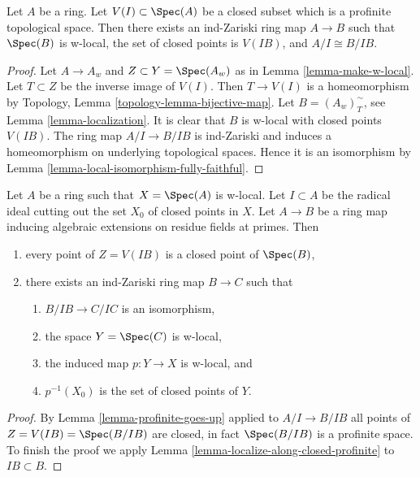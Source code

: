 \begin{lemma}
\label{lemma-localize-along-closed-profinite}
Let $A$ be a ring. Let $V(I) \subset \Spec(A)$ be a closed subset
which is a profinite topological space. Then there exists an
ind-Zariski ring map $A \to B$ such that $\Spec(B)$ is w-local,
the set of closed points is $V(IB)$, and $A/I \cong B/IB$.
\end{lemma}

\begin{proof}
Let $A \to A_w$ and $Z \subset Y = \Spec(A_w)$ as in
Lemma \ref{lemma-make-w-local}.
Let $T \subset Z$ be the inverse image of $V(I)$.
Then $T \to V(I)$ is a homeomorphism by
Topology, Lemma \ref{topology-lemma-bijective-map}.
Let $B = (A_w)_T^\sim$, see Lemma \ref{lemma-localization}.
It is clear that $B$ is w-local with closed points $V(IB)$.
The ring map $A/I \to B/IB$ is ind-Zariski
and induces a homeomorphism on underlying
topological spaces. Hence it is an isomorphism by
Lemma \ref{lemma-local-isomorphism-fully-faithful}.
\end{proof}

\begin{lemma}
\label{lemma-w-local-algebraic-residue-field-extensions}
Let $A$ be a ring such that $X = \Spec(A)$ is w-local. Let $I \subset A$
be the radical ideal cutting out the set $X_0$ of closed points in $X$.
Let $A \to B$ be a ring map inducing algebraic extensions on residue
fields at primes. Then
\begin{enumerate}
\item every point of $Z = V(IB)$ is a closed point of $\Spec(B)$,
\item there exists an ind-Zariski ring map $B \to C$ such that
\begin{enumerate}
\item $B/IB \to C/IC$ is an isomorphism,
\item the space $Y = \Spec(C)$ is w-local,
\item the induced map $p : Y \to X$ is w-local, and
\item $p^{-1}(X_0)$ is the set of closed points of $Y$.
\end{enumerate}
\end{enumerate}
\end{lemma}

\begin{proof}
By Lemma \ref{lemma-profinite-goes-up} applied to $A/I \to B/IB$
all points of $Z = V(IB) = \Spec(B/IB)$ are closed, in fact $\Spec(B/IB)$
is a profinite space.
To finish the proof we apply Lemma \ref{lemma-localize-along-closed-profinite}
to $IB \subset B$.
\end{proof}





